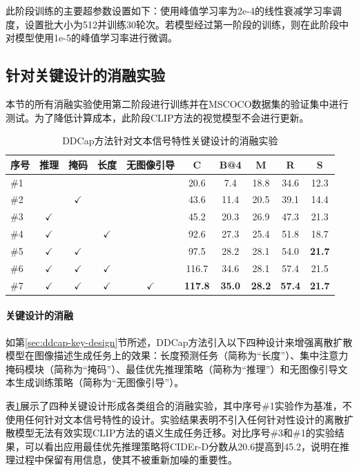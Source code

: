 此阶段训练的主要超参数设置如下：使用峰值学习率为2e-4的线性衰减学习率调度，设置批大小为512并训练30轮次。若模型经过第一阶段的训练，则在此阶段中对模型使用1e-5的峰值学习率进行微调。%

\subsection{针对关键设计的消融实验}
本节的所有消融实验使用第二阶段进行训练并在MSCOCO数据集的验证集中进行测试。为了降低计算成本，此阶段CLIP方法的视觉模型不会进行更新。%

\begin{table}
  \centering
  \caption{DDCap方法针对文本信号特性关键设计的消融实验}
  \begin{tabular}{lccccccccc}
    \toprule   
    序号  & 推理 & 掩码 & 长度 & 无图像引导 & C & B@4 & M & R & S \\    
    \midrule
    \#1  &&&&& 20.6 & 7.4  & 18.8 & 34.6 &12.3  \\ 
    \#2  &&$\checkmark$&&& 43.6 & 11.4  & 20.5 & 39.1 & 14.4  \\ 
    \#3   &$\checkmark$ &&&& 45.2 & 20.3  & 26.9 & 47.3 & 21.3  \\
    \#4 &$\checkmark$&&$\checkmark$& & 92.6 & 27.3  & 25.4 & 51.8 & 18.7\\
    \#5  &$\checkmark$&$\checkmark$&&& 97.5 & 28.2  & 28.1 & 54.0 & \textbf{21.7} \\
    \#6  &$\checkmark$&$\checkmark$&$\checkmark$&& 116.7 & 34.6  & 28.1 & 57.4 & 21.5\\
    \#7 &$\checkmark$&$\checkmark$&$\checkmark$&$\checkmark$& \textbf{117.8} & \textbf{35.0}  & \textbf{28.2} & \textbf{57.4} & \textbf{21.7}\\
    \bottomrule
  \end{tabular}
  \label{tab:ddcap-component}
\end{table}

\paragraph{关键设计的消融} 
\label{sec:ddcap-exp-abl}
如第\ref{sec:ddcap-key-design}节所述，DDCap方法引入以下四种设计来增强离散扩散模型在图像描述生成任务上的效果：长度预测任务（简称为“长度”）、集中注意力掩码模块（简称为“掩码”）、最佳优先推理策略（简称为“推理”）和无图像引导文本生成训练策略（简称为“无图像引导”）。

表\ref{tab:ddcap-component}展示了四种关键设计形成各类组合的消融实验，其中序号\#1实验作为基准，不使用任何针对文本信号特性的设计。实验结果表明不引入任何针对性设计的离散扩散模型无法有效实现CLIP方法的语义生成任务迁移。对比序号\#3和\#1的实验结果，可以看出应用最佳优先推理策略将CIDEr-D分数从20.6提高到45.2，说明在推理过程中保留有用信息，使其不被重新加噪的重要性。

